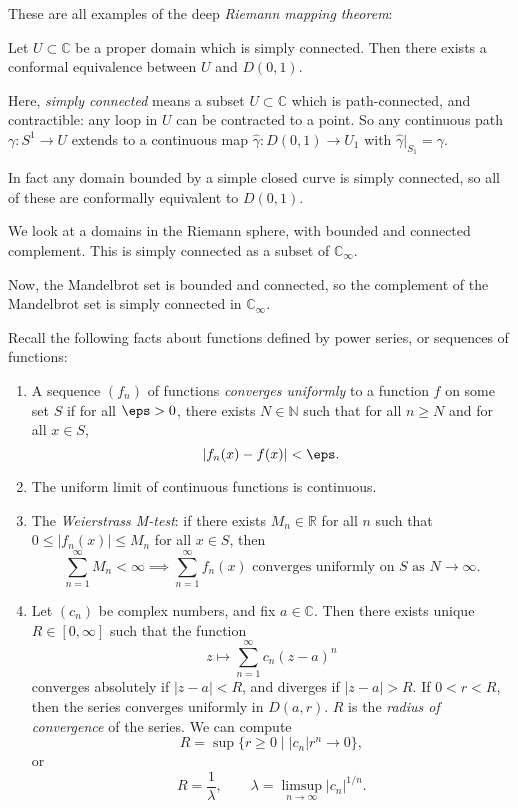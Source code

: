\documentclass[12pt]{article}
\begin{document}
These are all examples of the deep \emph{Riemann mapping theorem}:

\begin{theorem}
	Let $U \subset \mathbb{C}$ be a proper domain which is simply connected. Then there exists a conformal equivalence between $U$ and $D(0,1)$.
\end{theorem}

Here, \emph{simply connected} means a subset $U \subset \mathbb{C}$ which is path-connected, and contractible: any loop in $U$ can be contracted to a point. So any continuous path $\gamma : S^{1} \to U$ extends to a continuous map $\hat \gamma : D(0,1) \to U_1$ with $\hat \gamma|_{S_1} = \gamma$.

In fact any domain bounded by a simple closed curve is simply connected, so all of these are conformally equivalent to $D(0,1)$.

\begin{exbox}
	We look at a domains in the Riemann sphere, with bounded and connected complement. This is simply connected as a subset of $\mathbb{C}_{\infty}$.

	Now, the Mandelbrot set is bounded and connected, so the complement of the Mandelbrot set is simply connected in $\mathbb{C}_{\infty}$.
\end{exbox}

Recall the following facts about functions defined by power series, or sequences of functions:

\begin{enumerate}[1.]
	\item A sequence $(f_n)$ of functions \emph{converges uniformly} to a function $f$ on some set $S$ if for all $\eps > 0$, there exists $N \in \mathbb{N}$ such that for all $n \geq N$ and for all $x \in S$,
		\[
		|f_n(x) - f(x)| < \eps
		.\]
	\item The uniform limit of continuous functions is continuous.
	\item The \emph{Weierstrass M-test}: if there exists $M_n \in \mathbb{R}$ for all $n$ such that $0 \leq |f_n(x)| \leq M_n$ for all $x \in S$, then
		\[
			\sum_{n = 1}^{\infty}M_n < \infty \implies \sum_{n = 1}^{\infty}f_n(x) \text{ converges uniformly on $S$ as $N \to \infty$}
		.\]
	\item Let $(c_n)$ be complex numbers, and fix $a \in \mathbb{C}$. Then there exists unique $R \in [0, \infty]$ such that the function
		\[
		z \mapsto \sum_{n = 1}^{\infty}c_n (z - a)^{n}
		\]
		converges absolutely if $|z - a| < R$, and diverges if $|z-a| > R$. If $0 < r < R$, then the series converges uniformly in $D(a, r)$. $R$ is the \emph{radius of convergence} of the series. We can compute
		\[
			R = \sup\{r \geq 0 \mid |c_n|r^{n} \to 0\}
		,\]
		or
		\[
		R = \frac{1}{\lambda}, \qquad \lambda = \limsup_{n \to \infty} |c_n|^{1/n}
		.\]
\end{enumerate}
\end{document}
